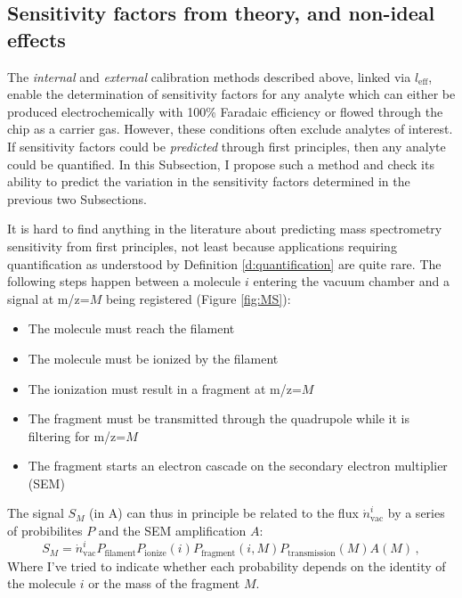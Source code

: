 \subsection{Sensitivity factors from theory, and non-ideal effects}\label{subsec:MS_theory}

The \textit{internal} and \textit{external} calibration methods described above, linked via $l_\text{eff}$, enable the determination of sensitivity factors for any analyte which can either be produced electrochemically with 100\% Faradaic efficiency or flowed through the chip as a carrier gas. However, these conditions often exclude analytes of interest. If sensitivity factors could be \textit{predicted} through first principles, then any analyte could be quantified. In this Subsection, I propose such a method and check its ability to predict the variation in the sensitivity factors determined in the previous two Subsections.

It is hard to find anything in the literature about predicting mass spectrometry sensitivity from first principles, not least because applications requiring quantification as understood by Definition \ref{d:quantification} are quite rare. The following steps happen between a molecule $i$ entering the vacuum chamber and a signal at m/z=$M$ being registered (Figure \ref{fig:MS})\cite{Gross2007}:
\begin{itemize}
	\item
	The molecule must reach the filament
	\item
	The molecule must be ionized by the filament
	\item
	The ionization must result in a fragment at m/z=$M$
	\item
	The fragment must be transmitted through the quadrupole while it is filtering for m/z=$M$
	\item
	The fragment starts an electron cascade on the secondary electron multiplier (SEM)
\end{itemize}
The signal $S_M$ (in A) can thus in principle be related to the flux $\dot{n}^i_\text{vac}$ by a series of probibilites $P$ and the SEM amplification $A$:
\begin{equation}
S_M = \dot{n}^i_\text{vac} P_\text{filament} P_\text{ionize}(i) P_\text{fragment}(i, M) P_\text{transmission}(M) A(M)\,,
\end{equation}
Where I've tried to indicate whether each probability depends on the identity of the molecule $i$ or the mass of the fragment $M$.

